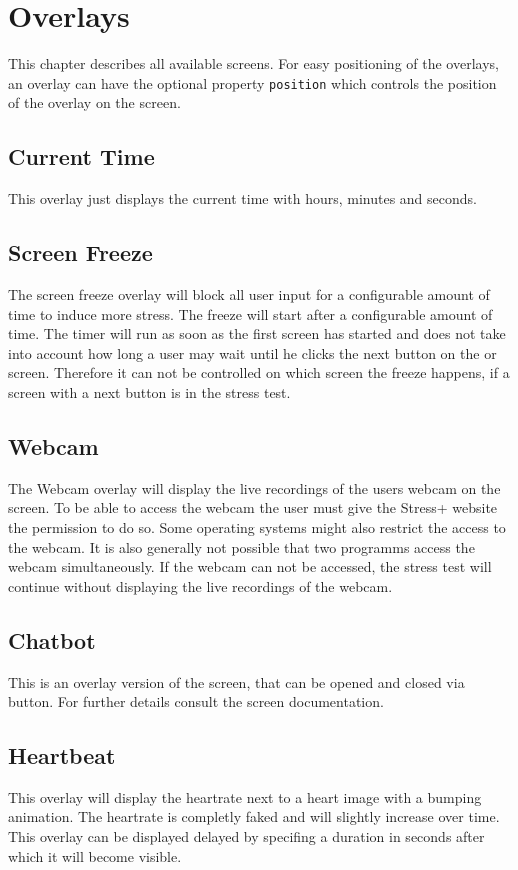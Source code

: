 \section{Overlays}
\label{sec:overlays}

This chapter describes all available screens.
For easy positioning of the overlays, an overlay can have the optional property \texttt{position} which controls the position of the overlay on the screen.

\subsection{Current Time}
\label{sec:overlays-current-time}
This overlay just displays the current time with hours, minutes and seconds.

\subsection{Screen Freeze}
\label{sec:overlays-screen-freeze}
The screen freeze overlay will block all user input for a configurable amount of time to induce more stress.
The freeze will start after a configurable amount of time.
The timer will run as soon as the first screen has started and does not take into account how long a user may wait until he clicks the next button on the  or  screen.
Therefore it can not be controlled on which screen the freeze happens, if a screen with a next button is in the stress test.

\subsection{Webcam}
\label{sec:overlays-webcam}
The Webcam overlay will display the live recordings of the users webcam on the screen.
To be able to access the webcam the user must give the Stress+ website the permission to do so.
Some operating systems might also restrict the access to the webcam.
It is also generally not possible that two programms access the webcam simultaneously.
If the webcam can not be accessed, the stress test will continue without displaying the live recordings of the webcam.

\subsection{Chatbot}
\label{sec:overlays-chatbot}
This is an overlay version of the  screen, that can be opened and closed via button.
For further details consult the  screen documentation.


\subsection{Heartbeat}
\label{sec:overlays-heartbeat}
This overlay will display the heartrate next to a heart image with a bumping animation.
The heartrate is completly faked and will slightly increase over time.
This overlay can be displayed delayed by specifing a duration in seconds after which it will become visible.

